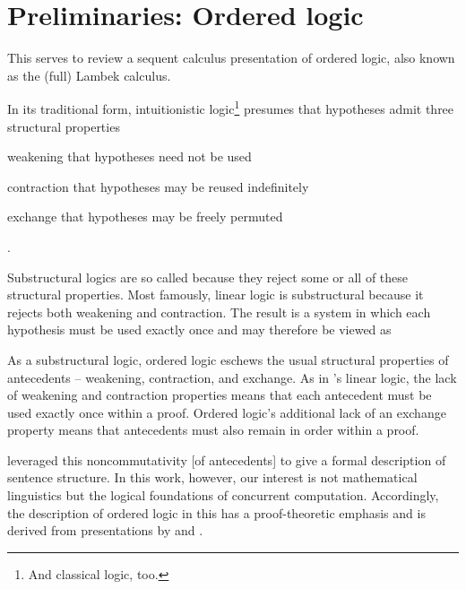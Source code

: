 \chapter{Preliminaries: Ordered logic}\label{ch:ordered-logic}



This  serves to review a sequent calculus presentation of ordered logic, also known as the (full) Lambek calculus\autocites{Lambek:AMM58}{Lambek:SLIM61}.

In its traditional form, intuitionistic logic\footnote{And classical logic, too.} presumes that hypotheses admit three structural properties
\begin{description*}[
  before=\unskip:\ ,
  font=\normalfont, afterlabel={,\ },
  itemjoin=;\ , itemjoin*=; and\ %
]
\item[weakening] that hypotheses need not be used
\item[contraction] that hypotheses may be reused indefinitely
\item[exchange] that hypotheses may be freely permuted
\end{description*}.

Substructural logics are so called because they reject some or all of these structural properties.
Most famously, linear logic\autocite{Girard:TCS87} is substructural because it rejects both weakening and contraction.
The result is a system in which each hypothesis must be used exactly once and may therefore be viewed as 

As a substructural logic, ordered logic eschews the usual structural properties of antecedents -- weakening, contraction, and exchange.
As in \citeauthor{Girard:TCS87}'s linear logic\autocite{Girard:TCS87}, the lack of weakening and contraction properties means that each antecedent must be used exactly once within a proof.
Ordered logic's additional lack of an exchange property means that antecedents must also remain in order within a proof.

 leveraged this noncommutativity [of antecedents] to give a formal description of sentence structure.
In this work, however, our interest is not mathematical linguistics but the logical foundations of concurrent computation.
Accordingly, the description of ordered logic in this  has a proof-theoretic emphasis and is derived from presentations by \textcite{Pfenning:CMU16} and \textcite{Polakow+Pfenning:MFPS99}.

